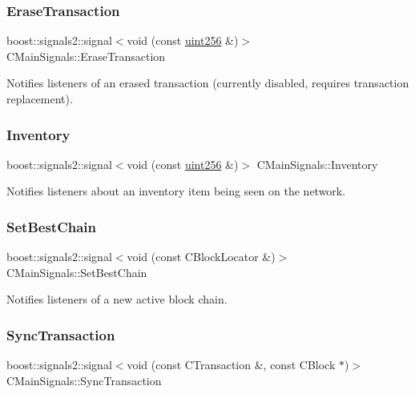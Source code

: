 \subsubsection{\texorpdfstring{Erase\+Transaction}{EraseTransaction}}
{\footnotesize\ttfamily boost\+::signals2\+::signal$<$void (const \mbox{\hyperlink{classuint256}{uint256}} \&)$>$ C\+Main\+Signals\+::\+Erase\+Transaction}

Notifies listeners of an erased transaction (currently disabled, requires transaction replacement). \mbox{\label{struct_c_main_signals_a2f8f94d91265dc946e97614042698a7b}} 
\subsubsection{\texorpdfstring{Inventory}{Inventory}}
{\footnotesize\ttfamily boost\+::signals2\+::signal$<$void (const \mbox{\hyperlink{classuint256}{uint256}} \&)$>$ C\+Main\+Signals\+::\+Inventory}

Notifies listeners about an inventory item being seen on the network. \mbox{\label{struct_c_main_signals_a11f2f18522ff7aa672eb5cc8c1f397b2}} 
\subsubsection{\texorpdfstring{Set\+Best\+Chain}{SetBestChain}}
{\footnotesize\ttfamily boost\+::signals2\+::signal$<$void (const C\+Block\+Locator \&)$>$ C\+Main\+Signals\+::\+Set\+Best\+Chain}

Notifies listeners of a new active block chain. \mbox{\label{struct_c_main_signals_a7ced7f332ed90d57110a78ad50d5a60f}} 
\subsubsection{\texorpdfstring{Sync\+Transaction}{SyncTransaction}}
{\footnotesize\ttfamily boost\+::signals2\+::signal$<$void (const C\+Transaction \&, const C\+Block $\ast$)$>$ C\+Main\+Signals\+::\+Sync\+Transaction}

